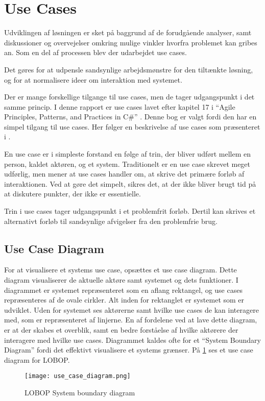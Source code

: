 \section{Use Cases}

Udviklingen af løsningen er sket på baggrund af de forudgående analyser, samt diskussioner og overvejelser omkring mulige vinkler hvorfra problemet kan gribes an. Som en del af processen blev der udarbejdet use cases.

Det gøres for at udpensle sandsynlige arbejdsmønstre for den tiltænkte løsning, og for at normalisere ideer om interaktion med systemet.

Der er mange forskellige tilgange til use cases, men de tager udgangspunkt i det samme princip. I denne rapport er use cases lavet efter kapitel 17 i \enquote{Agile Principles, Patterns, and Practices in C\#} \cite{martin2006agile}. Denne bog er valgt fordi den har en simpel tilgang til use cases. Her følger en beskrivelse af use cases som præsenteret i \cite{martin2006agile}.

En use case er i simpleste forstand en følge af trin, der bliver udført mellem en person, kaldet aktøren, og et system. Traditionelt er en use case skrevet meget udførlig, men \cite{martin2006agile} mener at use cases handler om, at skrive det primære forløb af interaktionen. Ved at gøre det simpelt, sikres det, at der ikke bliver brugt tid på at diskutere punkter, der ikke er essentielle.

Trin i use cases tager udgangspunkt i et problemfrit forløb. Dertil kan skrives et alternativt forløb til sandsynlige afvigelser fra den problemfrie brug.

\subsection*{Use Case Diagram}

For at visualisere et systems use case, opsættes et use case diagram. Dette diagram visualiserer de aktuelle aktøre samt systemet og dets funktioner. I diagrammet er systemet repræsenteret som en aflang rektangel, og use cases repræsenteres af de ovale cirkler. Alt inden for rektanglet er systemet som er udviklet. Uden for systemet ses aktørerne samt hvilke use cases de kan interagere med, som er repræsenteret af linjerne. En af fordelene ved at lave dette diagram, er at der skabes et overblik, samt en bedre forståelse af hvilke aktørere der interagere med hvilke use cases. Diagrammet kaldes ofte for et \enquote{System Boundary Diagram} fordi det effektivt visualisere et systems grænser. På \cref{fig:usecase} ses et use case diagram for LOBOP.

\begin{figure}
  \centering
    \texttt{[image: use\_case\_diagram.png]}
  \caption{LOBOP System boundary diagram}
  \label{fig:usecase}
\end{figure}